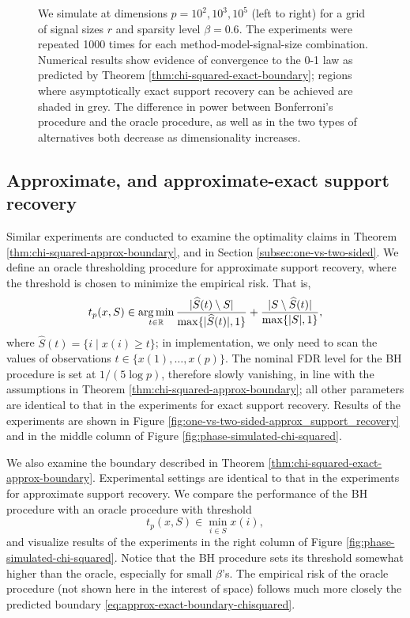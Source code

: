 \begin{figure}
{      We simulate at dimensions $p=10^2, 10^3, 10^5$ (left to right) for a grid of signal sizes $r$ and sparsity level $\beta=0.6$.
      The experiments were repeated 1000 times for each method-model-signal-size combination. 
      Numerical results show evidence of convergence to the 0-1 law as predicted by Theorem \ref{thm:chi-squared-exact-boundary}; regions where asymptotically exact support recovery can be achieved are shaded in grey.
      The difference in power between Bonferroni's procedure and the oracle procedure, as well as in the two types of alternatives both decrease as dimensionality increases.} 
      \label{fig:one-vs-two-sided-exact_support_recovery}
\end{figure}

\subsection{Approximate, and approximate-exact support recovery}

Similar experiments are conducted to examine the optimality claims in Theorem \ref{thm:chi-squared-approx-boundary}, and in Section \ref{subsec:one-vs-two-sided}.
We define an oracle thresholding procedure for approximate support recovery, where the threshold is chosen to minimize the empirical risk.
That is,
$$
t_p(x, S) \in \operatorname*{arg\,min}_{t\in\mathbb R} \frac{|\widehat{S}(t)\setminus S|}{\max\{|\widehat{S}(t)|,1\}} + \frac{|S\setminus \widehat{S}(t)|}{\max\{|{S}|,1\}},
$$
where $\widehat{S}(t) = \{i\;|\;x(i)\ge t\}$;
in implementation, we only need to scan the values of observations $t\in\{x(1), \ldots, x(p)\}$. 
The nominal FDR level for the BH procedure is set at $1/(5{\log{p}})$, therefore slowly vanishing, in line with the assumptions in Theorem \ref{thm:chi-squared-approx-boundary}; all other parameters are identical to that in the experiments for exact support recovery.
Results of the experiments are shown in Figure \ref{fig:one-vs-two-sided-approx_support_recovery} and in the middle column of Figure \ref{fig:phase-simulated-chi-squared}.

We also examine the boundary described in Theorem \ref{thm:chi-squared-exact-approx-boundary}.
Experimental settings are identical to that in the experiments for approximate support recovery.
We compare the performance of the BH procedure with an oracle procedure with threshold
$$
t_p(x, S) \in \min_{i\in S} x(i),
$$
and visualize results of the experiments in the right column of Figure \ref{fig:phase-simulated-chi-squared}.
Notice that the BH procedure sets its threshold somewhat higher than the oracle, especially for small $\beta$'s. 
The empirical risk of the oracle procedure (not shown here in the interest of space) follows much more closely the predicted boundary \eqref{eq:approx-exact-boundary-chisquared}.

